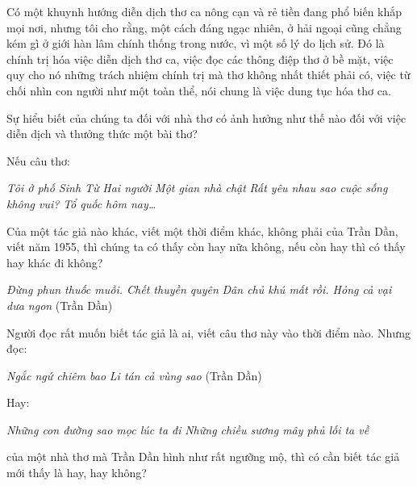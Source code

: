 \documentclass[../main.tex]{subfiles}
\begin{document}
\begin{multicols}{2}
Có một khuynh hướng diễn dịch thơ ca nông cạn và rẻ tiền đang phổ biến khắp mọi nơi, nhưng tôi cho rằng, một cách đáng ngạc nhiên, ở hải ngoại cũng chẳng kém gì ở giới hàn lâm chính thống trong nước, vì một số lý do lịch sử. Đó là chính trị hóa việc diễn dịch thơ ca, việc đọc các thông điệp thơ ở bề mặt, việc quy cho nó những trách nhiệm chính trị mà thơ không nhất thiết phải có, việc từ chối nhìn con người như một toàn thể, nói chung là việc dung tục hóa thơ ca. 

Sự hiểu biết của chúng ta đối với nhà thơ có ảnh hưởng như thế nào đối với việc diễn dịch và thưởng thức một bài thơ? 

Nếu câu thơ: 
\begin{blockquote}


\textit{Tôi ở phố Sinh Từ} 
\textit{Hai người} 
\textit{Một gian nhà chật} 
\textit{Rất yêu nhau sao cuộc sống không vui?} 
\textit{Tổ quốc hôm nay…} 

\end{blockquote}


Của một tác giả nào khác, viết một thời điểm khác, không phải của Trần Dần, viết năm 1955, thì chúng ta có thấy còn hay nữa không, nếu còn hay thì có thấy hay khác đi không? 
\begin{blockquote}


\textit{Đừng phun thuốc muỗi. Chết thuyền quyên} 
\textit{Dân chủ khú mất rồi. Hỏng cả vại dưa ngon} 
(Trần Dần) 

\end{blockquote}


Người đọc rất muốn biết tác giả là ai, viết câu thơ này vào thời điểm nào. 
Nhưng đọc: 
\begin{blockquote}


\textit{Ngắc ngứ chiêm bao} 
\textit{Li tán cả vùng sao} 
(Trần Dần) 

\end{blockquote}


Hay: 
\begin{blockquote}


\textit{Những con đường sao mọc lúc ta đi} 
\textit{Những chiều sương mây phủ lối ta về} 

\end{blockquote}


của một nhà thơ mà Trần Dần hình như rất ngưỡng mộ, thì có cần biết tác giả mới thấy là hay, hay không? 


\end{multicols}
\end{document}
